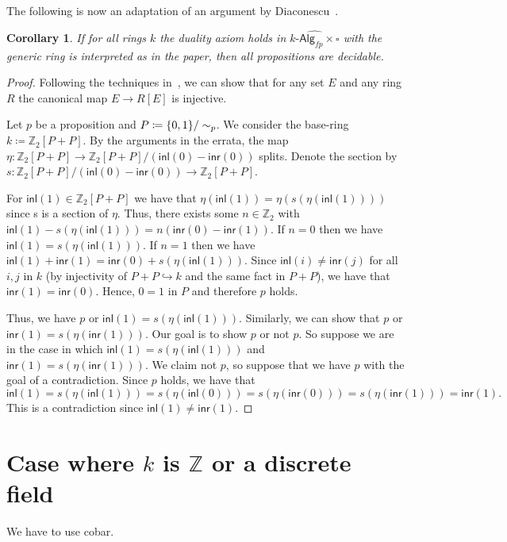 \documentclass[10pt,a4paper]{article}
\newtheorem{corollary}{Corollary}[section]
\newcommand{\ints}{\mathbb{Z}}
\newcommand{\Alg}{\mathsf{Alg}}
\newcommand\inl{\mathsf{inl}}
\newcommand\inr{\mathsf{inr}}
\DeclarePairedDelimiter\set{\{}{\}}
\begin{document}
The following is now an adaptation of an argument by Diaconescu~\cite{diaconescu1975choice}.

\begin{corollary}
  If for all rings \(k\) the duality axiom holds in \(\widehat{k\text{-}\Alg_{fp} \times \square}\) with the generic ring is interpreted as in the paper, then all propositions are decidable.
\end{corollary}
\begin{proof}
  Following the techniques in~\cite{mines}, we can show that for any set $E$ and any ring $R$ the canonical map $E \to R[E]$ is injective.

  Let $p$ be a proposition and $P \coloneqq \set{0,1} / \sim_p$.
  We consider the base-ring $k \coloneqq \ints_2[P + P]$.
  By the arguments in the errata, the map $\eta \colon \ints_2[P + P] \to \ints_2[P + P] / (\inl(0) - \inr(0))$ splits.
  Denote the section by $s : \ints_2[P + P] / (\inl(0) - \inr(0)) \to \ints_2[P + P]$.

  For $\inl(1) \in \ints_2[P + P]$ we have that $\eta(\inl(1)) = \eta(s(\eta(\inl(1))))$ since s is a section of $\eta$.
  Thus, there exists some $n \in \ints_2$ with $\inl(1) - s(\eta(\inl(1))) = n(\inr(0) - \inr(1))$.
  If $n = 0$ then we have $\inl(1) = s(\eta(\inl(1)))$.
  If $n = 1$ then we have $\inl(1) + \inr(1) = \inr(0) + s(\eta(\inl(1)))$.
  Since $\inl(i) \ne \inr(j)$ for all $i, j$ in $k$ (by injectivity of $P + P \hookrightarrow k$ and the same fact in $P + P$), we have that $\inr(1) = \inr(0)$.
  Hence, $0 = 1$ in $P$ and therefore $p$ holds.

  Thus, we have $p$ or $\inl(1) = s(\eta(\inl(1)))$.
  Similarly, we can show that $p$ or $\inr(1) = s(\eta(\inr(1)))$.
  Our goal is to show $p$ or not $p$.
  So suppose we are in the case in which $\inl(1) = s(\eta(\inl(1)))$ and $\inr(1) = s(\eta(\inr(1)))$.
  We claim not $p$, so suppose that we have $p$ with the goal of a contradiction.
  Since $p$ holds, we have that
  \[
    \inl(1) = s(\eta(\inl(1))) = s(\eta(\inl(0))) = s(\eta(\inr(0))) = s(\eta(\inr(1))) = \inr(1).
  \]
  This is a contradiction since $\inl(1) \ne \inr(1)$.
\end{proof}



\section{Case where $k$ is $\ints$ or a discrete field}

 We have to use cobar. %
\end{document}
